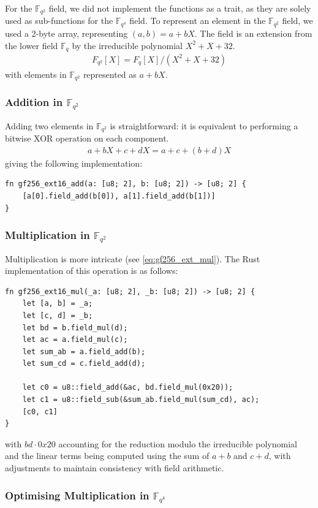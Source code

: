 \documentclass[11pt]{report}
\theoremstyle{definition}
\theoremstyle{plain}
\begin{document}
For the $\mathbb{F}_{q^2}$ field, we did not implement the functions as a trait, as they are solely used as sub-functions for the $\mathbb{F}_{q^4}$ field. To represent an element in the $\mathbb{F}_{q^2}$ field, we used a 2-byte array, representing $(a, b) = a + bX$. The field is an extension from the lower field $\mathbb{F}_q$ by the irreducible polynomial $X^2 + X + 32$.
\begin{align}
  F_{q^2}[X] = F_q[X] / (X^2 + X + 32)
\end{align}
with elements in $\mathbb{F}_{q^2}$ represented as $a + bX$.

\subsubsection*{Addition in $\mathbb{F}_{q^2}$}

Adding two elements in $\mathbb{F}_{q^2}$ is straightforward: it is equivalent to performing a bitwise XOR operation on each component.
\begin{align*}
  a + bX + c + dX = a+c + (b+d)X
\end{align*}
giving the following implementation:
\begin{verbatim}
fn gf256_ext16_add(a: [u8; 2], b: [u8; 2]) -> [u8; 2] {
    [a[0].field_add(b[0]), a[1].field_add(b[1])]
}
\end{verbatim}

\subsubsection*{Multiplication in $\mathbb{F}_{q^2}$}

Multiplication is more intricate (see \autoref{eq:gf256_ext_mul}). The Rust implementation of this operation is as follows:
\begin{verbatim}
fn gf256_ext16_mul(_a: [u8; 2], _b: [u8; 2]) -> [u8; 2] {
    let [a, b] = _a;
    let [c, d] = _b;
    let bd = b.field_mul(d);
    let ac = a.field_mul(c);
    let sum_ab = a.field_add(b);
    let sum_cd = c.field_add(d);

    let c0 = u8::field_add(&ac, bd.field_mul(0x20));
    let c1 = u8::field_sub(&sum_ab.field_mul(sum_cd), ac);
    [c0, c1]
}
\end{verbatim}
with $bd \cdot 0x20$ accounting for the reduction modulo the irreducible polynomial and the linear terms being computed using the sum of $a+b$ and $c+d$, with adjustments to maintain consistency with field arithmetic.

\subsubsection*{Optimising Multiplication in $\mathbb{F}_{q^4}$}
\end{document}
